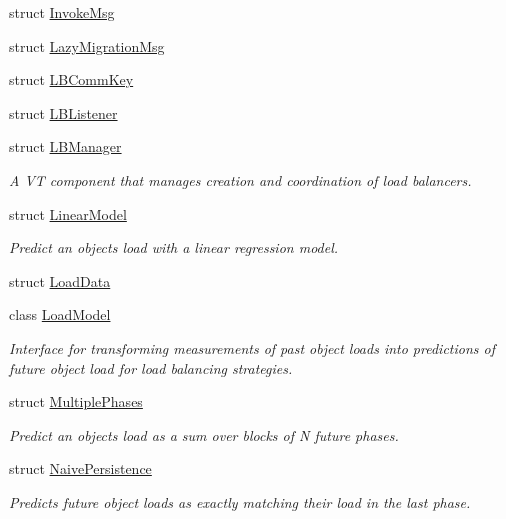 \begin{DoxyCompactItemize}
\item 
struct \hyperlink{structvt_1_1vrt_1_1collection_1_1balance_1_1_invoke_msg}{Invoke\+Msg}
\item 
struct \hyperlink{structvt_1_1vrt_1_1collection_1_1balance_1_1_lazy_migration_msg}{Lazy\+Migration\+Msg}
\item 
struct \hyperlink{structvt_1_1vrt_1_1collection_1_1balance_1_1_l_b_comm_key}{L\+B\+Comm\+Key}
\item 
struct \hyperlink{structvt_1_1vrt_1_1collection_1_1balance_1_1_l_b_listener}{L\+B\+Listener}
\item 
struct \hyperlink{structvt_1_1vrt_1_1collection_1_1balance_1_1_l_b_manager}{L\+B\+Manager}
\begin{DoxyCompactList}\small\item\em A VT component that manages creation and coordination of load balancers. \end{DoxyCompactList}\item 
struct \hyperlink{structvt_1_1vrt_1_1collection_1_1balance_1_1_linear_model}{Linear\+Model}
\begin{DoxyCompactList}\small\item\em Predict an object\textquotesingle{}s load with a linear regression model. \end{DoxyCompactList}\item 
struct \hyperlink{structvt_1_1vrt_1_1collection_1_1balance_1_1_load_data}{Load\+Data}
\item 
class \hyperlink{classvt_1_1vrt_1_1collection_1_1balance_1_1_load_model}{Load\+Model}
\begin{DoxyCompactList}\small\item\em Interface for transforming measurements of past object loads into predictions of future object load for load balancing strategies. \end{DoxyCompactList}\item 
struct \hyperlink{structvt_1_1vrt_1_1collection_1_1balance_1_1_multiple_phases}{Multiple\+Phases}
\begin{DoxyCompactList}\small\item\em Predict an object\textquotesingle{}s load as a sum over blocks of N future phases. \end{DoxyCompactList}\item 
struct \hyperlink{structvt_1_1vrt_1_1collection_1_1balance_1_1_naive_persistence}{Naive\+Persistence}
\begin{DoxyCompactList}\small\item\em Predicts future object loads as exactly matching their load in the last phase. \end{DoxyCompactList}\item 

\end{DoxyCompactItemize}
